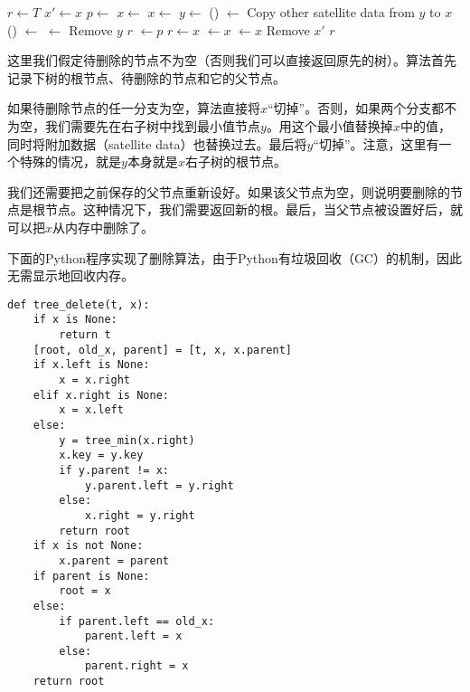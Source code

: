 \documentclass[UTF8]{article}
\begin{document}
\begin{algorithmic}[1]
  \State $r \gets T$
  \State $x' \gets x$ 
  \State $p \gets $ 
    \State $x \gets $ 
    \State $x \gets $ 
  \Else
    \State  $y \gets $ ()
    \State {} $\gets$ 
    \State Copy other satellite data from $y$ to $x$
      \State {}() $\gets$ 
    \Else
      \State {} $\gets$ 
    \EndIf
    \State Remove $y$
    \State \Return $r$
  \EndIf
    \State {} $\gets p$
  \EndIf
    \State $r \gets x$
  \Else
      \State {} $\gets x$
    \Else
      \State {} $\gets x$
    \EndIf
  \EndIf
  \State Remove $x'$
  \State \Return $r$
\EndFunction
\end{algorithmic}

这里我们假定待删除的节点不为空（否则我们可以直接返回原先的树）。算法首先记录下树的根节点、待删除的节点和它的父节点。

如果待删除节点的任一分支为空，算法直接将$x$“切掉”。否则，如果两个分支都不为空，我们需要先在右子树中找到最小值节点$y$。用这个最小值替换掉$x$中的值，同时将附加数据（satellite data）也替换过去。最后将$y$“切掉”。注意，这里有一个特殊的情况，就是$y$本身就是$x$右子树的根节点。

我们还需要把之前保存的父节点重新设好。如果该父节点为空，则说明要删除的节点是根节点。这种情况下，我们需要返回新的根。最后，当父节点被设置好后，就可以把$x$从内存中删除了。

下面的Python程序实现了删除算法，由于Python有垃圾回收（GC）的机制，因此无需显示地回收内存。

\lstset{language=Python}
\begin{lstlisting}
def tree_delete(t, x):
    if x is None:
        return t
    [root, old_x, parent] = [t, x, x.parent]
    if x.left is None:
        x = x.right
    elif x.right is None:
        x = x.left
    else:
        y = tree_min(x.right)
        x.key = y.key
        if y.parent != x:
            y.parent.left = y.right
        else:
            x.right = y.right
        return root
    if x is not None:
        x.parent = parent
    if parent is None:
        root = x
    else:
        if parent.left == old_x:
            parent.left = x
        else:
            parent.right = x
    return root
\end{lstlisting}
\end{document}
